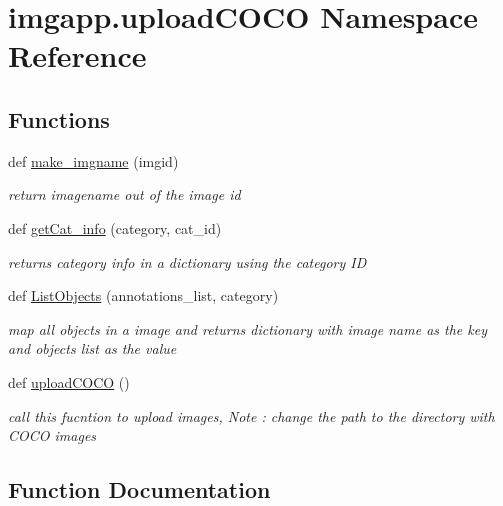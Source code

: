 \hypertarget{namespaceimgapp_1_1uploadCOCO}{}\section{imgapp.\+upload\+C\+O\+CO Namespace Reference}
\label{namespaceimgapp_1_1uploadCOCO}
\subsection*{Functions}
\begin{DoxyCompactItemize}
\item 
def \hyperlink{namespaceimgapp_1_1uploadCOCO_a00079a30241831574eb416c09fef0bbc}{make\+\_\+imgname} (imgid)
\begin{DoxyCompactList}\small\item\em return imagename out of the image id \end{DoxyCompactList}\item 
def \hyperlink{namespaceimgapp_1_1uploadCOCO_ac33f4c865b41867bda1f5197dab6f808}{get\+Cat\+\_\+info} (category, cat\+\_\+id)
\begin{DoxyCompactList}\small\item\em returns category info in a dictionary using the category ID \end{DoxyCompactList}\item 
def \hyperlink{namespaceimgapp_1_1uploadCOCO_ad068eaf76576fa93dc00dcd4082bed86}{List\+Objects} (annotations\+\_\+list, category)
\begin{DoxyCompactList}\small\item\em map all objects in a image and returns dictionary with image name as the key and objects list as the value \end{DoxyCompactList}\item 
def \hyperlink{namespaceimgapp_1_1uploadCOCO_a43518ccef3fb3c5b5afac1881a520292}{upload\+C\+O\+CO} ()
\begin{DoxyCompactList}\small\item\em call this fucntion to upload images, Note \+: change the path to the directory with C\+O\+CO images \end{DoxyCompactList}\end{DoxyCompactItemize}


\subsection{Function Documentation}
\mbox{\label{namespaceimgapp_1_1uploadCOCO_ac33f4c865b41867bda1f5197dab6f808}} 
